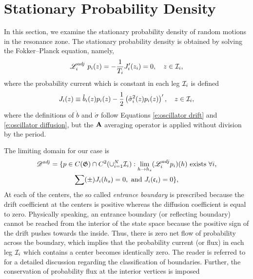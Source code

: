 \section{Stationary Probability Density}
\label{S:stationary pdf}

In this section, we examine the stationary probability density of random motions in the resonance zone. The stationary probability density is obtained by solving the Fokker--Planck equation, namely,
\begin{equation}
\gen_i^{adj}\ p_i(z)=-\frac{1}{\period_i}J_i'(z_i) =0, \quad z \in \Int_i,
\label{e:FPE}
\end{equation}
where the probability current which is constant in each leg $\mathcal I_i$ is defined
\[
J_i(z) \equiv \mathring b_i(z) p_i(z)- \frac12
\left({\mathring \sigma}^2_i(z) p_i(z)\right)', \quad z \in
\mathcal I_i,
\]
where the definitions of $\mathring b$ and $\mathring \sigma$ follow Equations \eqref{e:oscillator drift} and \eqref{e:oscillator diffusion}, but the $\operatorname{\mathbf A}$ averaging operator is applied without division by the period.

The limiting domain for our case is
\begin{multline*}
\mathscr D^{adj} = \{p\in C(\mathfrak G)\cap C^2(\cup_{i=1}^N\mathcal I_i):
\text{$\lim_{h \to h_s}(\mathscr L^{adj}_i p_i)(h)$ exists $\forall
i$,}\\
\sum (\pm)J_i(h_s)=0, \text{ and } J_i(\mathfrak c_i)=0 \},
\label{E:dom-adjoint}
\end{multline*}
At each of the centers, the so called \emph{entrance boundary} is prescribed because the drift coefficient at the centers is positive whereas the diffusion coefficient is equal to zero. Physically speaking, an entrance boundary (or reflecting boundary) cannot be reached from the interior of the state space because the positive sign of the drift pushes towards the inside. Thus, there is zero net flow of probability across the boundary, which implies that the probability current (or flux) in each leg $\mathcal I_i$ which contains a center becomes identically zero. The reader is referred to \citet{karlin81:_secon_cours_stoch_proces} for a detailed discussion regarding the classification of boundaries. Further, the conservation of probability flux at the interior vertices is imposed

